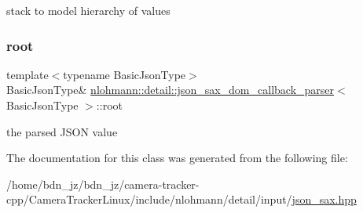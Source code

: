 stack to model hierarchy of values 

\mbox{\label{classnlohmann_1_1detail_1_1json__sax__dom__callback__parser_a7b12037ca38be3ddec09c42bd71080cc}} 
\subsubsection{\texorpdfstring{root}{root}}
{\footnotesize\ttfamily template$<$typename Basic\+Json\+Type$>$ \\
Basic\+Json\+Type\& \hyperlink{classnlohmann_1_1detail_1_1json__sax__dom__callback__parser}{nlohmann\+::detail\+::json\+\_\+sax\+\_\+dom\+\_\+callback\+\_\+parser}$<$ Basic\+Json\+Type $>$\+::root\hspace{0.3cm}{\ttfamily [private]}}



the parsed J\+S\+ON value 



The documentation for this class was generated from the following file\+:\begin{DoxyCompactItemize}
\item 
/home/bdn\+\_\+jz/bdn\+\_\+jz/camera-\/tracker-\/cpp/\+Camera\+Tracker\+Linux/include/nlohmann/detail/input/\hyperlink{json__sax_8hpp}{json\+\_\+sax.\+hpp}\end{DoxyCompactItemize}

